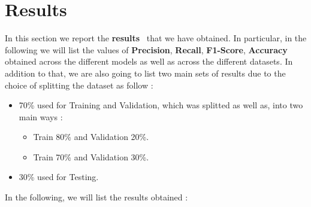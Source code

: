 \section{Results}
In this section we report the \textbf{results}~\cite{github-code} that we have obtained. In particular, in the following we will list the values of \textbf{Precision}, \textbf{Recall}, \textbf{F1-Score}, \textbf{Accuracy} obtained across the different models as well as across the different datasets.
In addition to that, we are also going to list two main sets of results due to the choice of splitting the dataset as follow :
\begin{itemize}
    \item 70\% used for Training and Validation, which was splitted as well as, into two main ways :
        \begin{itemize}
            \item Train 80\% and Validation 20\%.
            \item Train 70\% and Validation 30\%.
        \end{itemize}
    \item 30\% used for Testing.
\end{itemize}

In the following, we will list the results obtained :

